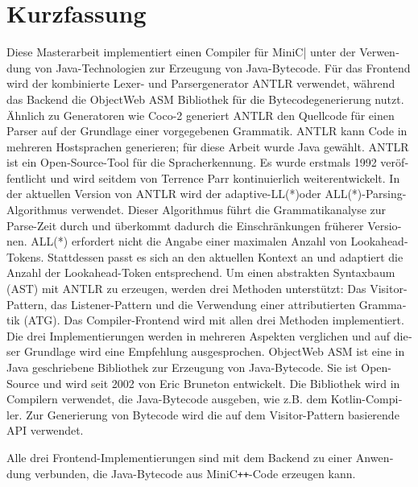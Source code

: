 \chapter{Kurzfassung}


\begin{german}

Diese Masterarbeit implementiert einen Compiler für MiniC\verb++| unter der Verwendung von Java-Technologien zur Erzeugung von Java-Bytecode. Für das Frontend wird der kombinierte Lexer- und Parsergenerator ANTLR verwendet, während das Backend die ObjectWeb ASM Bibliothek für die Bytecodegenerierung nutzt. Ähnlich zu Generatoren wie Coco-2 generiert ANTLR den Quellcode für einen Parser auf der Grundlage einer vorgegebenen Grammatik. ANTLR kann Code in mehreren Hostsprachen generieren; für diese Arbeit wurde Java gewählt. 
ANTLR ist ein Open-Source-Tool für die Spracherkennung. Es wurde erstmals 1992 veröffentlicht und wird seitdem von Terrence Parr kontinuierlich weiterentwickelt. In der aktuellen Version von ANTLR wird der adaptive-LL(*)oder ALL(*)-Parsing-Algorithmus verwendet. Dieser Algorithmus führt die Grammatikanalyse zur Parse-Zeit durch und überkommt dadurch die Einschränkungen früherer Versionen. ALL(*) erfordert nicht die Angabe einer maximalen Anzahl von Lookahead-Tokens. Stattdessen passt es sich an den aktuellen Kontext an und adaptiert die Anzahl der Lookahead-Token entsprechend.
Um einen abstrakten Syntaxbaum (AST) mit ANTLR zu erzeugen, werden drei Methoden unterstützt: Das Visitor-Pattern, das Listener-Pattern und die Verwendung einer attributierten Grammatik (ATG). Das Compiler-Frontend wird mit allen drei Methoden implementiert. Die drei Implementierungen werden in mehreren Aspekten verglichen und auf dieser Grundlage wird eine Empfehlung ausgesprochen.
ObjectWeb ASM ist eine in Java geschriebene Bibliothek zur Erzeugung von Java-Bytecode. Sie ist Open-Source und wird seit 2002 von Eric Bruneton entwickelt. Die Bibliothek wird in Compilern verwendet, die Java-Bytecode ausgeben, wie z.B. dem Kotlin-Compiler. Zur Generierung von Bytecode wird die auf dem Visitor-Pattern basierende API verwendet. 

Alle drei Frontend-Implementierungen sind mit dem Backend zu einer Anwendung verbunden, die Java-Bytecode aus MiniC\verb|++|-Code erzeugen kann. 

\end{german}
